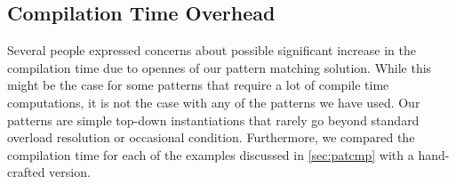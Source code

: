 \subsection{Compilation Time Overhead}
\label{sec:ctcmp}

Several people expressed concerns about possible significant increase in 
the compilation time due to opennes of our pattern matching solution. While this 
might be the case for some patterns that require a lot of compile time 
computations, it is not the case with any of the patterns we have used. Our patterns are 
simple top-down instantiations that rarely go beyond standard overload 
resolution or occasional  condition. Furthermore, we compared the compilation 
time for each of the examples discussed in \textsection\ref{sec:patcmp}
with a hand-crafted version.

